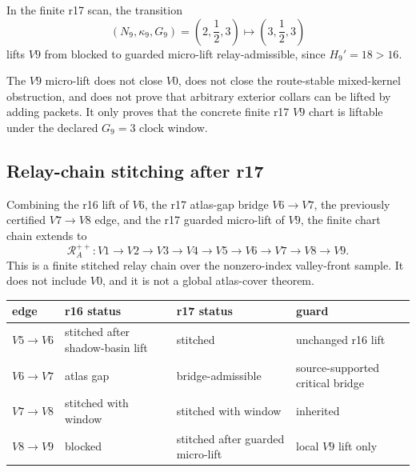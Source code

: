 \begin{lemma}
\label{lem:v470-r17-v9-microlift}
In the finite r17 scan, the transition
\[
(N_9,\kappa_9,G_9)=\left(2,\frac12,3\right)
\longmapsto
\left(3,\frac12,3\right)
\]
lifts \(V9\) from blocked to guarded micro-lift relay-admissible, since
\(H_9'=18>16\).
\end{lemma}

\begin{remark}
\label{rem:v470-r17-v9-nonclaim}
The \(V9\) micro-lift does not close \(V0\), does not close the route-stable
mixed-kernel obstruction, and does not prove that arbitrary exterior collars
can be lifted by adding packets.  It only proves that the concrete finite r17
\(V9\) chart is liftable under the declared \(G_9=3\) clock window.
\end{remark}

\subsection{Relay-chain stitching after r17}
\label{subsec:v470-r17-relay-chain-stitching}

Combining the r16 lift of \(V6\), the r17 atlas-gap bridge \(V6\to V7\), the
previously certified \(V7\to V8\) edge, and the r17 guarded micro-lift of
\(V9\), the finite chart chain extends to
\[
\mathcal R_A^{++}:
V1\to V2\to V3\to V4\to V5\to V6\to V7\to V8\to V9.
\]
This is a finite stitched relay chain over the nonzero-index valley-front
sample.  It does not include \(V0\), and it is not a global atlas-cover theorem.

\begin{center}
\begin{tabular}{@{}>{\raggedright\arraybackslash}p{.14\linewidth}>{\raggedright\arraybackslash}p{.25\linewidth}>{\raggedright\arraybackslash}p{.25\linewidth}>{\raggedright\arraybackslash}p{.25\linewidth}@{}}
\toprule
edge & r16 status & r17 status & guard\\
\midrule
$V5\to V6$  & stitched after shadow-basin lift  & stitched  & unchanged r16 lift\\
$V6\to V7$  & atlas gap  & bridge-admissible  & source-supported critical bridge\\
$V7\to V8$  & stitched with window  & stitched with window  & inherited\\
$V8\to V9$  & blocked  & stitched after guarded micro-lift  & local \(V9\) lift only\\
\bottomrule
\end{tabular}
\end{center}


